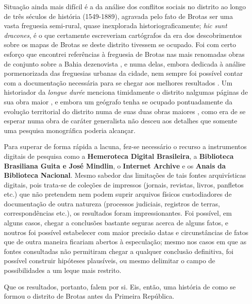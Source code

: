 Situação ainda mais difícil é a da análise dos conflitos sociais no distrito ao longo de três séculos de história (1549-1889), agravada pelo fato de Brotas ser uma vasta freguesia semi-rural, quase inexplorada historiograficamente; \textit{hic sunt dracones}, é o que certamente escreveriam cartógrafos da era dos descobrimentos sobre os mapas de Brotas se deste distrito tivessem se ocupado. Foi com certo esforço que encontrei referências à freguesia de Brotas nas mais renomadas obras de conjunto sobre a Bahia dezenovista \cite{MATTOSO1978, MATTOSO1992, NASCIMENTO2007}, e numa delas, embora dedicada à análise pormenorizada das freguesias urbanas da cidade, nem sempre foi possível contar com a documentação necessária para se chegar aos melhores resultados \cite{NASCIMENTO2007}. Um historiador da \textit{longue durée} menciona timidamente o distrito nalgumas páginas de sua obra maior \cite{tavares_historia_2008}, e embora um geógrafo tenha se ocupado pontuadamente da evolução territorial do distrito numa de suas duas obras maiores \cite{VASCONCELOS2002}, como era de se esperar numa obra de caráter generalista não desceu aos detalhes que somente uma pesquisa monográfica poderia alcançar. 

Para superar de forma rápida a lacuna, fez-se necessário o recurso a instrumentos digitais de pesquisa como a \textbf{Hemeroteca Digital Brasileira}, a \textbf{Biblioteca Brasiliana Guita e José Mindlin}, o \textbf{Internet Archive} e os \textbf{Anais da Biblioteca Nacional}. Mesmo sabedor das limitações de tais fontes arquivísticas digitais, pois trata-se de coleções de impressos (jornais, revistas, livros, panfletos etc.) que não pretendem nem podem suprir arquivos físicos custodiadores de documentação de outra natureza (processos judiciais, registros de terras, correspondências etc.), os resultados foram impressionantes. Foi possível, em alguns casos, chegar a conclusões bastante seguras acerca de alguns fatos, e noutros foi possível estabelecer com maior precisão datas e circunstâncias de fatos que de outra maneira ficariam abertos à especulação; mesmo nos casos em que as fontes consultadas não permitiram chegar a qualquer conclusão definitiva, foi possível construir hipóteses plausíveis, ou mesmo delimitar o campo de possibilidades a um leque mais restrito.

Que os resultados, portanto, falem por si. Eis, então, uma história de como se formou o distrito de Brotas antes da Primeira República.







